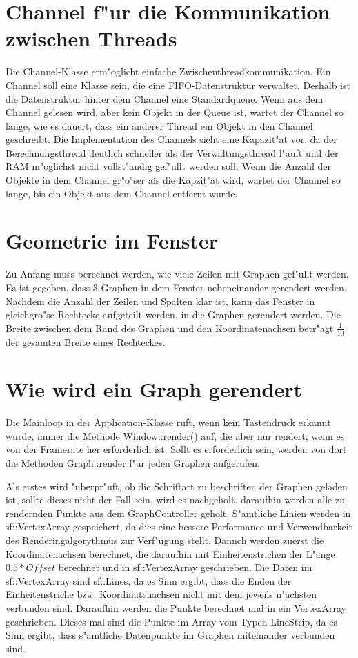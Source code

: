 \documentclass[14pt, a4paper]{report}
\begin{document}
\section{Channel f"ur die Kommunikation zwischen Threads}
Die Channel-Klasse erm"oglicht einfache Zwischenthreadkommunikation. Ein Channel soll
eine Klasse sein, die eine FIFO-Datenstruktur verwaltet. Deshalb ist die Datenstruktur
hinter dem Channel eine Standardqueue. Wenn aus dem Channel gelesen wird, aber kein 
Objekt in der Queue ist, wartet der Channel so lange, wie es dauert, dass ein anderer
Thread ein Objekt in den Channel geschreibt. Die Implementation des Channels sieht
eine Kapazit"at vor, da der Berechnungsthread deutlich schneller als der 
Verwaltungsthread l"auft und der RAM m"oglichst nicht vollst"andig gef"ullt werden soll.
Wenn die Anzahl der Objekte in dem Channel gr"o"ser als die Kapzit"at wird, wartet der 
Channel so lange, bis ein Objekt aus dem Channel entfernt wurde.

\section{Geometrie im Fenster}
Zu Anfang muss berechnet werden, wie viele Zeilen mit Graphen gef"ullt werden. Es ist
gegeben, dass 3 Graphen in dem Fenster nebeneinander gerendert werden. Nachdem die 
Anzahl der Zeilen und Spalten klar ist, kann das Fenster in gleichgro"se Rechtecke
aufgeteilt werden, in die Graphen gerendert werden. Die Breite zwischen dem Rand des 
Graphen und den Koordinatenachsen betr"agt $\frac{1}{10}$ der gesamten Breite eines
Rechteckes.

\section{Wie wird ein Graph gerendert}
Die Mainloop in der Application-Klasse ruft, wenn kein Tastendruck erkannt wurde, immer
die Methode Window::render() auf, die aber nur rendert, wenn es von der Framerate her
erforderlich ist. Sollt es erforderlich sein, werden von dort die Methoden Graph::render
f"ur jeden Graphen aufgerufen.

Als erstes wird "uberpr"uft, ob die Schriftart zu beschriften der Graphen geladen ist,
sollte dieses nicht der Fall sein, wird es nachgeholt. daraufhin werden alle zu 
rendernden Punkte aus dem GraphController geholt. S"amtliche Linien werden in 
sf::VertexArray gespeichert, da dies eine bessere Performance und Verwendbarkeit des
Renderingalgorythmus zur Verf"ugung stellt. Dannch werden zuerst die Koordinatenachsen 
berechnet, die daraufhin mit Einheitenstrichen der L"ange $0.5 * Offset$ berechnet und
in sf::VertexArray geschrieben. Die Daten im sf::VertexArray sind sf::Lines, da es Sinn
ergibt, dass die Enden der Einheitenstriche bzw. Koordinatenachsen nicht mit dem jeweils
n"achsten verbunden sind. Daraufhin werden die Punkte berechnet und in ein VertexArray
geschrieben. Dieses mal sind die Punkte im Array vom Typen LineStrip, da es Sinn ergibt,
dass s"amtliche Datenpunkte im Graphen miteinander verbunden sind.
\end{document}

